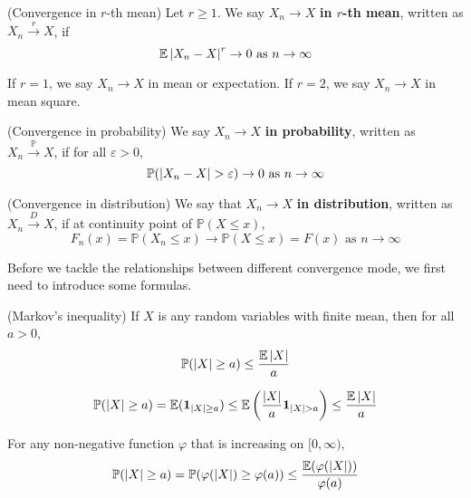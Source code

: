 \documentclass{huhtakm-template-book}
\newcommand{\prob}{\mathbb{P}}
\newcommand{\expect}{\mathbb{E}}
\begin{document}
\begin{defn}(Convergence in $r$-th mean)
	Let $r\geq 1$. We say $X_{n}\to X$ \textbf{in $r$-th mean}, written as $X_{n}\xrightarrow{r}X$, if
	\begin{equation*}
		\expect\abs{X_{n}-X}^{r}\to 0\text{ as }n\to\infty
	\end{equation*}
\end{defn}
\begin{eg}
	If $r=1$, we say $X_{n}\to X$ in mean or expectation. If $r=2$, we say $X_{n}\to X$ in mean square.
\end{eg}
\begin{defn}(Convergence in probability)
	We say $X_{n}\to X$ \textbf{in probability}, written as $X_{n}\xrightarrow{\prob}X$, if for all $\varepsilon>0$,
	\begin{equation*}
		\prob(\abs{X_{n}-X}>\varepsilon)\to 0\text{ as }n\to\infty
	\end{equation*}
\end{defn}
\begin{defn}(Convergence in distribution)
	We say that $X_{n}\to X$ \textbf{in distribution}, written as $X_{n}\xrightarrow{D}X$, if at continuity point of $\prob(X\leq x)$,
	\begin{equation*}
		F_{n}(x)=\prob(X_{n}\leq x)\to\prob(X\leq x)=F(x)\text{ as }n\to\infty
	\end{equation*}
\end{defn}
Before we tackle the relationships between different convergence mode, we first need to introduce some formulas.
\begin{lem}(Markov's inequality)
	If $X$ is any random variables with finite mean, then for all $a>0$,
	\begin{equation*}
		\prob(\abs{X}\geq a)\leq\frac{\expect\abs{X}}{a}
	\end{equation*}
\end{lem}
\begin{proofing}
	\begin{equation*}
		\prob(\abs{X}\geq a)=\expect(\mathbf{1}_{\abs{X}\geq a})\leq\expect\left(\frac{\abs{X}}{a}\mathbf{1}_{\abs{X}>a}\right)\leq\frac{\expect\abs{X}}{a}
	\end{equation*}
\end{proofing}
\begin{rem}
	For any non-negative function $\varphi$ that is increasing on $[0,\infty)$,
	\begin{equation*}
		\prob(\abs{X}\geq a)=\prob(\varphi(\abs{X})\geq\varphi(a))\leq\frac{\expect(\varphi(\abs{X}))}{\varphi(a)}
	\end{equation*}
\end{rem}
\end{document}
